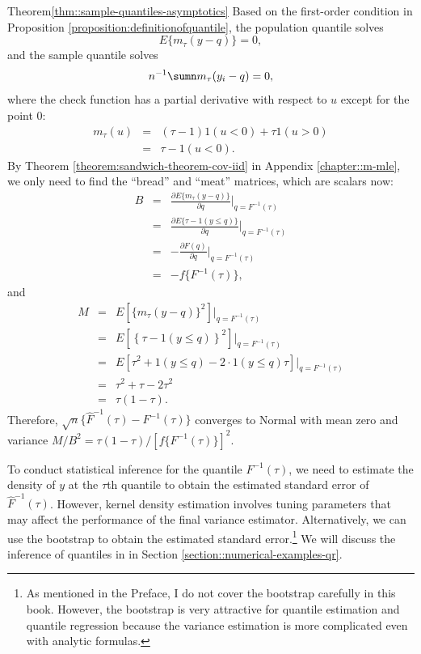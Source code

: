 \begin{myproof}{Theorem}{\ref{thm::sample-quantiles-asymptotics}}
Based on the first-order condition in  Proposition \ref{proposition:definitionofquantile}, the population quantile solves
$$
E \{ m_\tau(y - q) \} =0,
$$
and the sample quantile solves
$$
n^{-1} \sumn m_\tau(y_i - q)  = 0,
$$
where the check function has a partial derivative with respect to
$u$ except for the point $0$: 
\begin{eqnarray*}
m_{\tau}(u) &=&  (\tau-1)1(u<0)+\tau1(u>0) \\
&=&\tau-1(u < 0).
\end{eqnarray*}
By Theorem \ref{theorem:sandwich-theorem-cov-iid} in Appendix \ref{chapter::m-mle},  we only need to find the ``bread'' and ``meat'' matrices, which are scalars now:
\begin{eqnarray*}
B &=& \frac{\partial   E \{ m_\tau(y - q) \}  }{ \partial q}\Big | _{q = F^{-1}(\tau)}\\
&=& \frac{\partial   E \{ \tau-1(y\leq q) \}  }{ \partial q}\Big | _{q =F^{-1}(\tau)}\\
&=& -\frac{\partial   F(q)   }{ \partial q}\Big | _{q =F^{-1}(\tau)}\\
&=& -f\{F^{-1}(\tau) \},
\end{eqnarray*}
and
\begin{eqnarray*}
M &=& E \left[ \{ m_\tau(y - q) \}^2 \right] \Big | _{q =F^{-1}(\tau)} \\
&=& E \left[ \left\{ \tau-1(y\leq q) \right\}^2 \right] \Big | _{q =F^{-1}(\tau)} \\
&=& E \left[ \tau^2 + 1(y\leq q) - 2\cdot  1(y\leq q) \tau \right] \Big | _{q =F^{-1}(\tau)} \\
&=& \tau^2 + \tau - 2\tau^2 \\
&=& \tau(1-\tau).
\end{eqnarray*}
Therefore, $\sqrt{n}\{ \hat{F}^{-1}(\tau)-F^{-1}(\tau)\}$ converges to Normal with mean zero and variance $M/B^2 = \tau(1-\tau)/ [f\{F^{-1}(\tau) \}]^2$. 
\end{myproof}



To conduct statistical inference for the quantile $F^{-1}(\tau)$, we need to estimate the density of $y$ at the $\tau$th quantile to obtain the estimated standard error of $\hat{F}^{-1}(\tau)$. However, kernel density estimation involves tuning parameters that may affect the performance of the final variance estimator. Alternatively, we can use the bootstrap to obtain the estimated standard error.\footnote{
As mentioned in the Preface, I do not cover the bootstrap carefully in this book. However, the bootstrap is very attractive for quantile estimation and quantile regression because the variance estimation is more complicated even with analytic formulas. 
} We will discuss the inference of quantiles in  in Section \ref{section::numerical-examples-qr}. 



